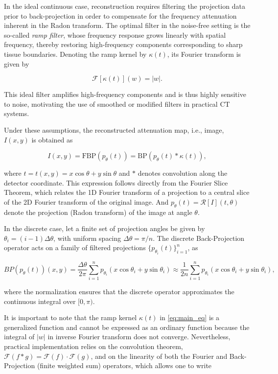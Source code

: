 In the ideal continuous case, reconstruction requires filtering the projection data prior to back-projection in order to compensate for the frequency attenuation inherent in the Radon transform. The optimal filter in the noise-free setting is the so-called \textit{ramp filter}, whose frequency response grows linearly with spatial frequency, thereby restoring high-frequency components corresponding to sharp tissue boundaries. Denoting the ramp kernel by $\kappa(t)$, its Fourier transform is given by

\[
\mathcal{F}[\kappa(t)](w) = |w|.
\]

This ideal filter amplifies high-frequency components and is thus highly sensitive to noise, motivating the use of smoothed or modified filters in practical CT systems.

Under these assumptions, the reconstructed attenuation map, i.e., image, $I(x, y)$ is obtained as

\begin{equation}
	\label{eq:main_eq}
	I(x, y) = \text{FBP}(p_\theta(t)) = \text{BP}(p_\theta(t) * \kappa(t)),
\end{equation}

\noindent
where $t = t(x,y) = x\cos\theta + y\sin\theta$ and $*$ denotes convolution along the detector coordinate. This expression follows directly from the Fourier Slice Theorem, which relates the 1D Fourier transform of a projection to a central slice of the 2D Fourier transform of the original image. And $p_{\theta} (t) = \mathcal{R}[I](t, \theta)$ denote the projection (Radon transform) of the image at angle $\theta$.

In the discrete case, let a finite set of projection angles be given by $\theta_i = (i - 1) \Delta \theta$, with uniform spacing $\Delta \theta = \pi / n$. The discrete Back-Projection operator acts on a family of filtered projections $\{ p_{\theta_i} (t)\}_{i=1}^n$, as

\[
BP(p_\theta(t))(x, y) = \frac{\Delta\theta}{2\pi}\sum\limits_{i=1}^n p_{\theta_i}(x\cos\theta_i + y\sin\theta_i) \approx \frac{1}{2n}\sum\limits_{i=1}^n p_{\theta_i}(x\cos\theta_i + y\sin\theta_i),
\]

\noindent
where the normalization ensures that the discrete operator approximates the continuous integral over $[0, \pi)$.

It is important to note that the ramp kernel $\kappa(t)$ in \eqref{eq:main_eq} is a generalized function and cannot be expressed as an ordinary function because the integral of $|w|$ in inverse Fourier transform does not converge. Nevertheless, practical implementation relies on the convolution theorem, $\mathcal{F}(f*g) = \mathcal{F}(f)\cdot\mathcal{F}(g)$, and on the linearity of both the Fourier and Back-Projection (finite weighted sum) operators, which allows one to write

